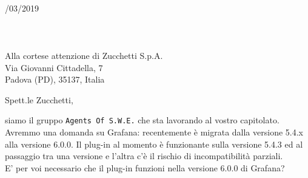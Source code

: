 \documentclass[11pt, a4paper]{letter} %
\begin{document}

\begin{letter}{
	\-\\/03/2019
	\-\\\-\\\-\\\-\\
	Alla cortese attenzione di Zucchetti S.p.A. \\
	Via Giovanni Cittadella, 7\\
	Padova (PD), 35137, Italia
}


\opening{Spett.le Zucchetti,}

siamo il gruppo \texttt{Agents Of S.W.E.} che sta lavorando al vostro capitolato.\\
Avremmo una domanda su Grafana: recentemente è migrata dalla versione 5.4.x alla versione 6.0.0. Il plug-in al momento è funzionante sulla versione 5.4.3 ed al passaggio tra una versione e l'altra c'è il rischio di incompatibilità parziali.\\
E' per voi necessario che il plug-in funzioni nella versione 6.0.0 di Grafana?\\



\end{letter}
\end{document}
